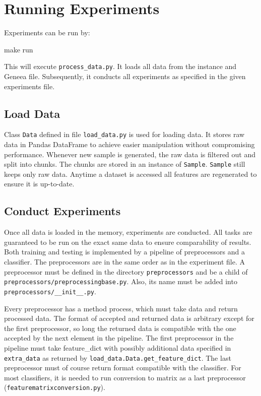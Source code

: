 \section{Running Experiments}

Experiments can be run by:

\begin{code}
make run
\end{code}

This will execute \texttt{process\_data.py}.
It loads all data from the instance and Geneea file.
Subsequently, it conducts all experiments as specified in the given experiments file.

\subsection{Load Data}

Class \texttt{Data} defined in file \texttt{load\_data.py} is used for loading data.
It stores raw data in Pandas DataFrame to achieve easier manipulation without compromising performance.
Whenever new sample is generated, the raw data is filtered out and split
into chunks.
The chunks are stored in an instance of \texttt{Sample}.
\texttt{Sample} still keeps only raw data.
Anytime a dataset is accessed all features are regenerated to ensure it is up-to-date.


\subsection{Conduct Experiments}

Once all data is loaded in the memory, experiments are conducted.
All tasks are guaranteed to be run on the exact same data to ensure comparability of results.
Both training and testing is implemented by a pipeline of preprocessors and a classifier.
The preprocessors are in the same order as in the experiment file.
A preprocessor must be defined in the directory \texttt{preprocessors} and be a child of \texttt{preprocessors/preprocessingbase.py}.
Also, its name must be added into \texttt{preprocessors/\_\_init\_\_.py}.

Every preprocessor has a method process, which must take data and return processed data.
The format of accepted and returned data is arbitrary except for the first preprocessor,
so long the returned data is compatible with the one accepted by the next element in the pipeline.
The first preprocessor in the pipeline must take feature\_dict with possibly additional data specified in \texttt{extra\_data} as returned by \texttt{load\_data.Data.get\_feature\_dict}.
The last preprocessor must of course return format compatible with the classifier.
For most classifiers, it is needed to run conversion to matrix as a last preprocessor (\texttt{featurematrixconversion.py}).

